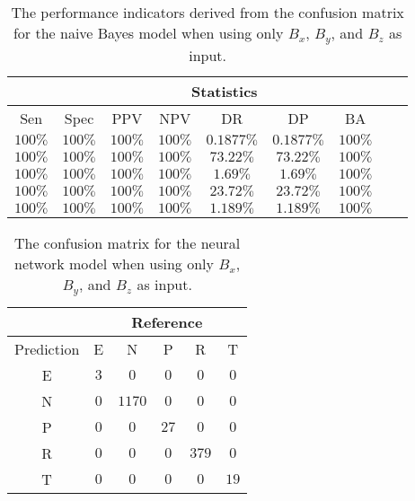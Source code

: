 \begin{table}[!ht]
	\centering
	\begin{tabular}{|c|c|c|c|c|c|c|c|c|}
		\hline
		 & \multicolumn{7}{c|}{Statistics} \\ \hline
		Sen & Spec & PPV & NPV & DR & DP & BA \\ \hline
		$100\%$ & $100\%$ & $100\%$ & $100\%$ & $0.1877\%$ & $0.1877\%$ & $100\%$ \\ \hline
		$100\%$ & $100\%$ & $100\%$ & $100\%$ & $73.22\%$ & $73.22\%$ & $100\%$ \\ \hline
		$100\%$ & $100\%$ & $100\%$ & $100\%$ & $1.69\%$ & $1.69\%$ & $100\%$ \\ \hline
		$100\%$ & $100\%$ & $100\%$ & $100\%$ & $23.72\%$ & $23.72\%$ & $100\%$ \\ \hline
		$100\%$ & $100\%$ & $100\%$ & $100\%$ & $1.189\%$ & $1.189\%$ & $100\%$ \\ \hline
	\end{tabular}
	\caption{The performance indicators derived from the confusion matrix for the naive Bayes model when using only $B_{x}$, $B_{y}$, and $B_{z}$ as input.}
	\label{tab:cs:coord:nb}
\end{table}

\begin{table}[!ht]
	\centering
	\begin{tabular}{|c|c|c|c|c|c|}
		\hline
		 & \multicolumn{5}{|c|}{Reference} \\ \hline
		 Prediction & E & N & P & R & T \\ \hline
		 E & $3$ & $0$ & $0$ & $0$ & $0$ \\ \hline
		 N & $0$ & $1170$ & $0$ & $0$ & $0$ \\ \hline
		 P & $0$ & $0$ & $27$ & $0$ & $0$ \\ \hline
		 R & $0$ & $0$ & $0$ & $379$ & $0$ \\ \hline
		 T & $0$ & $0$ & $0$ & $0$ & $19$ \\ \hline
	\end{tabular}
	\caption{The confusion matrix for the neural network model when using only $B_{x}$, $B_{y}$, and $B_{z}$ as input.}
	\label{tab:cm:coord:nnet}
\end{table}

